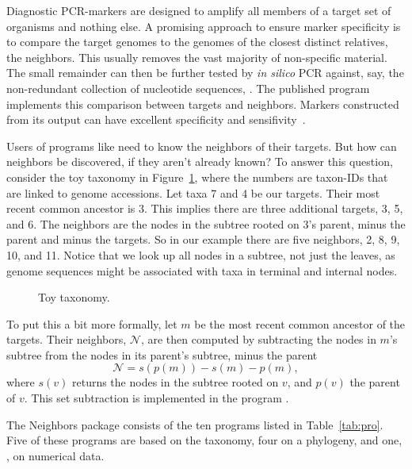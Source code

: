 Diagnostic PCR-markers are designed to amplify all members of a target
set of organisms and nothing else. A promising approach to ensure
marker specificity is to compare the target genomes to the genomes of
the closest distinct relatives, the neighbors. This usually removes
the vast majority of non-specific material. The small remainder can
then be further tested by \emph{in silico} PCR against, say, the
non-redundant collection of nucleotide sequences, . The
published program  implements this comparison between targets
and neighbors. Markers constructed from its output can have excellent
specificity and sensifivity~\cite{hau21:fur}.

Users of programs like  need to know the neighbors of their
targets. But how can neighbors be discovered, if they aren't already
known? To answer this question, consider the toy taxonomy in
Figure~\ref{fig:tax}, where the numbers are taxon-IDs that are linked
to genome accessions. Let taxa 7 and 4 be our targets. Their most
recent common ancestor is 3. This implies there are three additional
targets, 3, 5, and 6. The neighbors are the nodes in the subtree
rooted on 3's parent, minus the parent and minus the targets. So in
our example there are five neighbors, 2, 8, 9, 10, and 11. Notice that
we look up all nodes in a subtree, not just the leaves, as genome
sequences might be associated with taxa in terminal and internal
nodes.

\begin{figure}
\begin{center}

\end{center}
\caption{Toy taxonomy.}\label{fig:tax}
\end{figure}

To put this a bit more formally, let $m$ be the most recent common
ancestor of the targets. Their neighbors, $\mathcal{N}$, are then
computed by subtracting the nodes in $m$'s subtree from the nodes in
its parent's subtree, minus the parent
\begin{equation}\label{eq:nei}
\mathcal{N} = s(p(m)) - s(m) - p(m),
\end{equation}
where $s(v)$ returns the nodes in the subtree rooted on $v$, and
$p(v)$ the parent of $v$. This set subtraction is implemented in the
program .

The Neighbors package consists of the ten programs listed in
Table~\ref{tab:pro}. Five of these programs are based on the taxonomy,
four on a phylogeny, and one, , on numerical data.

